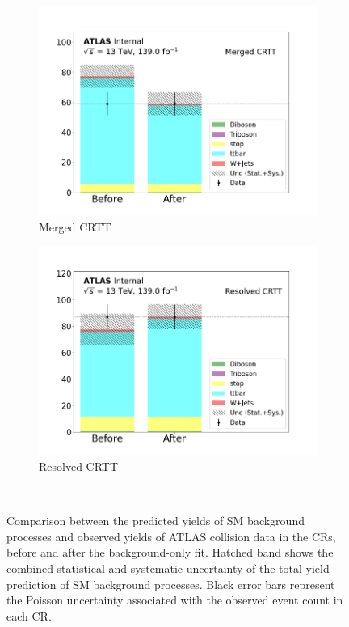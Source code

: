 \begin{figure}[h]
\begin{subfigure}{0.45\textwidth}
    \includegraphics[width=\textwidth]{Figures/8/CRTT_Merged_before_after.pdf}
    \caption{Merged CRTT}\label{fig:before_after_CRTT_merged}
  \end{subfigure} \hspace{1em}
  \begin{subfigure}{0.45\textwidth}
    \includegraphics[width=\textwidth]{Figures/8/CRTT_Resolved_before_after.pdf}
    \caption{Resolved CRTT}\label{fig:before_after_CRTT_resolved}
  \end{subfigure} \\ \vspace{1em}
  \caption[]{Comparison between the predicted yields of SM background processes and observed yields of ATLAS collision data in the CRs, before and after the background-only fit. Hatched band shows the combined statistical and systematic uncertainty of the total yield prediction of SM background processes. Black error bars represent the Poisson uncertainty associated with the observed event count in each CR.}
  \label{fig:before_after_CRs}
\end{figure}

